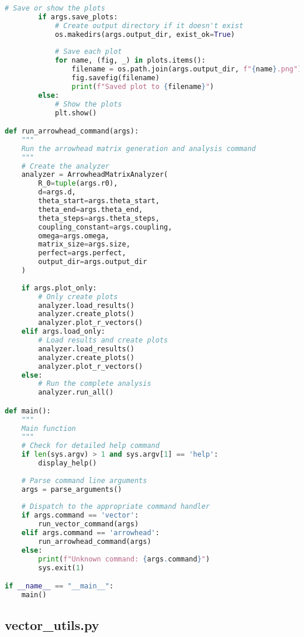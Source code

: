 \begin{lstlisting}[language=Python]
        # Save or show the plots
        if args.save_plots:
            # Create output directory if it doesn't exist
            os.makedirs(args.output_dir, exist_ok=True)
            
            # Save each plot
            for name, (fig, _) in plots.items():
                filename = os.path.join(args.output_dir, f"{name}.png")
                fig.savefig(filename)
                print(f"Saved plot to {filename}")
        else:
            # Show the plots
            plt.show()

def run_arrowhead_command(args):
    """
    Run the arrowhead matrix generation and analysis command
    """
    # Create the analyzer
    analyzer = ArrowheadMatrixAnalyzer(
        R_0=tuple(args.r0),
        d=args.d,
        theta_start=args.theta_start,
        theta_end=args.theta_end,
        theta_steps=args.theta_steps,
        coupling_constant=args.coupling,
        omega=args.omega,
        matrix_size=args.size,
        perfect=args.perfect,
        output_dir=args.output_dir
    )
    
    if args.plot_only:
        # Only create plots
        analyzer.load_results()
        analyzer.create_plots()
        analyzer.plot_r_vectors()
    elif args.load_only:
        # Load results and create plots
        analyzer.load_results()
        analyzer.create_plots()
        analyzer.plot_r_vectors()
    else:
        # Run the complete analysis
        analyzer.run_all()

def main():
    """
    Main function
    """
    # Check for detailed help command
    if len(sys.argv) > 1 and sys.argv[1] == 'help':
        display_help()
    
    # Parse command line arguments
    args = parse_arguments()
    
    # Dispatch to the appropriate command handler
    if args.command == 'vector':
        run_vector_command(args)
    elif args.command == 'arrowhead':
        run_arrowhead_command(args)
    else:
        print(f"Unknown command: {args.command}")
        sys.exit(1)

if __name__ == "__main__":
    main()
\end{lstlisting}

\subsection{vector\_utils.py}

